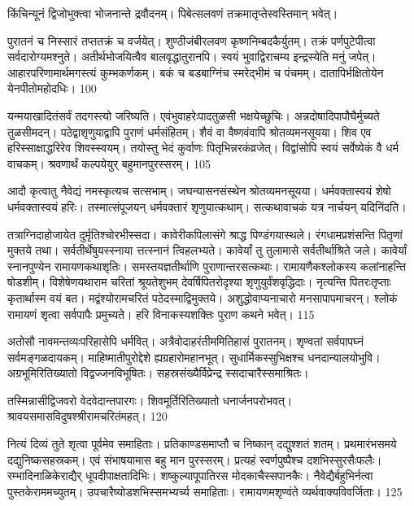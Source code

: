 किंचिन्यूनं द्विजोभुक्त्वा भोजनान्ते द्रवौदनम्।
पिबेत्सलवणं तक्रमातृप्तेस्वस्तिमान् भवेत्।

पुरातनं च निस्सारं तप्ततक्रं च वर्जयेत्।
शुण्ठीजंबीरलवण कृष्णनिम्बदकैर्युतम्।
तक्रं पर्णपुटेपीत्वा सर्वदारोग्यमश्नुते।
अतीर्थभोजयित्वैव बालवृद्धातुरानपि।
स्वयं भुवाद्विराचम्य इन्द्रस्येति मनुं जपेत्।
आहारपरिणामार्थमगस्त्यं कुम्भकर्णकम्।
बकं च बडबाग्निंच स्मरेद्भीमं च पंचमम्।
दातापिर्भक्षितोयेन येनपीतोमहोदधिः।
100

यन्मयाखादितंसर्वं तदगस्त्यो जरिष्यति।
एवंभुवाहरेःपादतुळसी भक्षयेच्छुचिः।
अन्नदोषादिपापौघैर्मुच्यते तुळसीमदन्।
पठेद्वाशृणुयाद्वापि पुराणं धर्मसंहितम्।
शैवं वा वैष्णवंवापि श्रोतव्यमनसूयया।
शिव एव हरिस्साक्षाद्धरिरेव शिवस्स्वयम्।
तयोस्तु भेदं कुर्वाणः पितृभिन्नरकंव्रजेत्।
विद्वांसोपि स्वयं सर्वेष्येकं वै धर्म वाचकम्।
श्रवणार्थं कल्पयेयुर् बहुमानपुरस्सरम्।
105

आदौ कृत्वातु नैवेद्यं नमस्कृत्यच सत्सभाम्।
जघन्यासनसंस्थेन श्रोतव्यमनसूयया।
धर्मवक्तास्वयं शेषो धर्मवक्तास्वयं हरिः।
तस्मात्संपूजयन् धर्मवक्तारं शृणुयात्कथाम्।
सत्कथावाचकं यत्र नार्चयन् यदिनिंदति।

तत्राग्निदाहोजायेत दुर्मृतिश्चोरभीस्सदा।
कावेरीकपिलासंगे श्राद्ध पिण्डंगयास्थले।
रंगधामप्रशंसन्ति पितृणां मुक्तये तथा।
सर्वतीर्थेषुयस्स्नाया त्तत्स्नानं त्विहलभ्यते।
कावेर्यां तु तुलामासे सर्वतीर्थाश्रिते जले।
कावेर्यां स्नानपुण्येन रामायणकथाशृतिः।
समस्तयज्ञतीर्थाणि पुराणान्तरसत्कथाः।
रामायणैकश्लोकस्य कलांनाहन्ति षोडशीम्।
विशेषेणयथाराम चरितां श्रूयतेशुभम् देवर्षिपितरोदृश्या शृणुयुर्वंशवृद्धिदाः।
नृत्यन्ति पितरःतृप्ताः कृतार्थास्म वयं बत।
मद्वंश्योरामचरितं पठेदस्माद्विमुक्तये।
अशुद्धोवाप्यनाचारो मनसापापमाचरन्।
श्लोकं रामायणं शृत्वा सर्वपापैः प्रमुच्यते।
हरि विनाकस्यशक्तिः पुराण कथने भवेत्।
115

अतोसौ नावमन्तव्यःपरिहासेपि धर्मवित्।
अत्रैवोदाहरंतीममितिहासं पुरातनम्।
शृण्वतां सर्वपापघ्नं सर्वमङ्गळदायकम्।
माहिष्मातीपुरोद्देशे ह्यग्रहारोमहानभूत्।
सुधार्मिकस्सुभिक्षश्च धनदान्यालयोभुवि।
अग्रभूमिरितिख्यातो विद्वज्जनविभूषितः।
सहस्रसंख्यैर्विप्रेन्द्र स्सदाचारैस्समाश्रितः।

तस्मिन्नासीद्विजवरो वेदवेदान्तपारगः।
शिवमूर्तिरितिख्यातो धनार्जनपरोभवत्।
श्रावयसमासविदुषश्श्रीरामचरितंमहत्।
120

नित्यं दिव्यं तुते शृत्वा पूर्वमेव समाहिताः।
प्रतिकाण्डसमाप्तौ च निष्कान् दद्युश्शतं शतम्।
प्रथमारंभसमये दद्युनिष्कसहस्रकम्।
एवं संभाषयामास बहु मान पुरस्सरम्।
प्रत्यहं स्वर्णपुष्पैश्च दशभिस्सुरसैःफलैः।
रम्भादिनाळिकेराद्यैर् धूपदीपाक्षतादिभिः।
शष्कुल्यापूपातिरस मोदकाचैस्सपानकैः।
नैवेद्यैर्बहुभिर्नत्वा पुस्तकेराममच्युतम्।
उपचारैष्योडशभिस्समभ्यर्च्य समाहिताः।
रामायणमशृण्वंते व्यर्थवाक्यविवर्जिताः।
125

